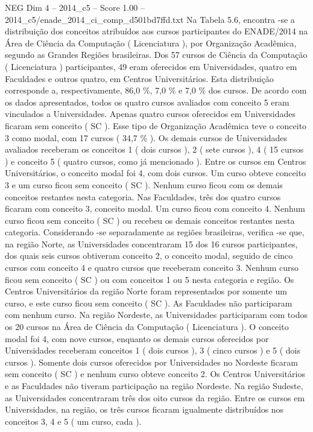 \begin{textsample}{NEG Dim 4 – 2014\_c5 – Score 1.00 – 2014\_c5/enade\_2014\_ci\_comp\_d501bd7ffd.txt}
Na Tabela 5.6, encontra -se a distribuição dos conceitos atribuídos aos cursos participantes do ENADE/2014 na Área de Ciência da Computação ( Licenciatura ), por Organização Acadêmica, segundo as Grandes Regiões brasileiras.
Dos 57 cursos de Ciência da Computação ( Licenciatura ) participantes, 49 eram oferecidos em Universidades, quatro em Faculdades e outros quatro, em Centros Universitários.
Esta distribuição corresponde a, respectivamente, 86,0 \%, 7,0 \% e 7,0 \% dos cursos.
De acordo com os dados apresentados, todos os quatro cursos avaliados com conceito 5 eram vinculados a Universidades.
Apenas quatro cursos oferecidos em Universidades ficaram sem conceito ( SC ).
Esse tipo de Organização Acadêmica teve o conceito 3 como modal, com 17 cursos ( 34,7 \% ).
Os demais cursos de Universidades avaliados receberam os conceitos 1 ( dois cursos ), 2 ( sete cursos ), 4 ( 15 cursos ) e conceito 5 ( quatro cursos, como já mencionado ).
Entre os cursos em Centros Universitários, o conceito modal foi 4, com dois cursos.
Um curso obteve conceito 3 e um curso ficou sem conceito ( SC ).
Nenhum curso ficou com os demais conceitos restantes nesta categoria.
Nas Faculdades, três dos quatro cursos ficaram com conceito 3, conceito modal.
Um curso ficou com conceito 4.
Nenhum curso ficou sem conceito ( SC ) ou recebeu os demais conceitos restantes nesta categoria.
Considerando -se separadamente as regiões brasileiras, verifica -se que, na região Norte, as Universidades concentraram 15 dos 16 cursos participantes, dos quais seis cursos obtiveram conceito 2, o conceito modal, seguido de cinco cursos com conceito 4 e quatro cursos que receberam conceito 3.
Nenhum curso ficou sem conceito ( SC ) ou com conceitos 1 ou 5 nesta categoria e região.
Os Centros Universitários da região Norte foram representados por somente um curso, e este curso ficou sem conceito ( SC ).
As Faculdades não participaram com nenhum curso.
Na região Nordeste, as Universidades participaram com todos os 20 cursos na Área de Ciência da Computação ( Licenciatura ).
O conceito modal foi 4, com nove cursos, enquanto os demais cursos oferecidos por Universidades receberam conceitos 1 ( dois cursos ), 3 ( cinco cursos ) e 5 ( dois cursos ).
Somente dois cursos oferecidos por Universidades no Nordeste ficaram sem conceito ( SC ) e nenhum curso obteve conceito 2.
Os Centros Universitários e as Faculdades não tiveram participação na região Nordeste.
Na região Sudeste, as Universidades concentraram três dos oito cursos da região.
Entre os cursos em Universidades, na região, os três cursos ficaram igualmente distribuídos nos conceitos 3, 4 e 5 ( um curso, cada ).

\end{textsample}
